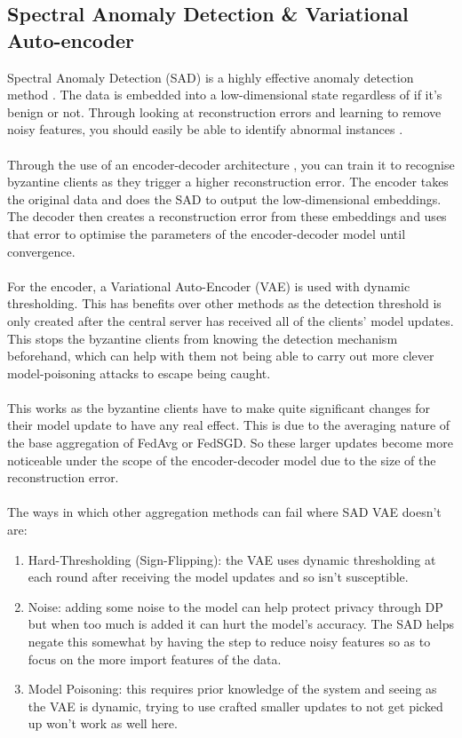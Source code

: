 \subsection{Spectral Anomaly Detection \& Variational Auto-encoder}
Spectral Anomaly Detection (SAD) is a highly effective anomaly detection method \cite{sad}.
The data is embedded into a low-dimensional state regardless of if it's benign or not.
Through looking at reconstruction errors and learning to remove noisy features, you should easily be able to identify abnormal instances \cite{variationalAB}.
\\ \\
Through the use of an encoder-decoder architecture \cite{spectral}, you can train it to recognise byzantine clients as they trigger a higher reconstruction error.
The encoder takes the original data and does the SAD to output the low-dimensional embeddings.
The decoder then creates a reconstruction error from these embeddings and uses that error to optimise the parameters of the encoder-decoder model until convergence.
\\ \\
For the encoder, a Variational Auto-Encoder (VAE) is used with dynamic thresholding.
This has benefits over other methods as the detection threshold is only created after the central server has received all of the clients' model updates.
This stops the byzantine clients from knowing the detection mechanism beforehand, which can help with them not being able to carry out more clever model-poisoning attacks to escape being caught.
\\ \\
This works as the byzantine clients have to make quite significant changes for their model update to have any real effect.
This is due to the averaging nature of the base aggregation of FedAvg or FedSGD.
So these larger updates become more noticeable under the scope of the encoder-decoder model due to the size of the reconstruction error.
\\ \\
The ways in which other aggregation methods can fail where SAD VAE doesn't are:
\begin{enumerate}
    \item Hard-Thresholding (Sign-Flipping): the VAE uses dynamic thresholding at each round after receiving the model updates and so isn't susceptible.
    
    \item Noise: adding some noise to the model can help protect privacy through DP but when too much is added it can hurt the model's accuracy. 
    The SAD helps negate this somewhat by having the step to reduce noisy features so as to focus on the more import features of the data.
    
    \item Model Poisoning: this requires prior knowledge of the system and seeing as the VAE is dynamic, trying to use crafted smaller updates to not get picked up won't work as well here.
\end{enumerate}
